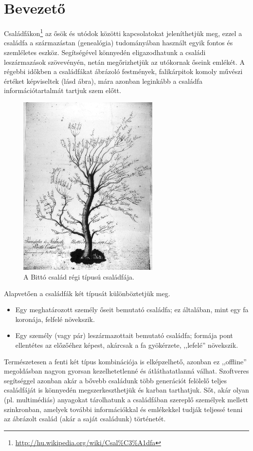 \chapter*{Bevezető}

Családfákon\footnote{\url{http://hu.wikipedia.org/wiki/Csal\%C3\%A1dfa}} az ősök és utódok közötti kapcsolatokat jeleníthetjük meg, ezzel a családfa a származástan (genealógia) tudományában használt egyik fontos és szemléletes eszköz. Segítségével könnyedén eligazodhatunk a családi leszármazások szövevényén, netán megőrizhetjük az utókornak őseink emlékét. A régebbi időkben a családfákat ábrázoló festmények, falikárpitok komoly művészi értéket képviseltek (lásd  ábra), mára azonban leginkább a családfa információtartalmát tartjuk szem előtt.

\begin{figure}[!ht]
\centering
\includegraphics[width=70mm, keepaspectratio]{figures/bitto_csaladfa.png}
\caption{A Bittó család régi típusú családfája.}
\label{fig:bitto_csaladfa}
\end{figure}

Alapvetően a családfák két típusát különböztetjük meg.

\begin{itemize}
 \item Egy meghatározott személy őseit bemutató családfa; ez általában, mint egy fa koronája, felfelé növekszik.
 \item Egy személy (vagy pár) leszármazottait bemutató családfa; formája pont ellentétes az előzőéhez képest, akárcsak a fa gyökérzete, ,,lefelé'' növekszik.
\end{itemize}

Természetesen a fenti két típus kombinációja is elképzelhető, azonban ez ,,offline'' megoldásban nagyon gyorsan kezelhetetlenné és átláthatatlanná válhat. Szoftveres segítséggel azonban akár a bővebb családunk több generációt felölelő teljes családfáját is könnyedén megszerkeszthetjük és karban tarthatjuk. Sőt, akár olyan (pl. multimédiás) anyagokat tárolhatunk a családfában szereplő személyek mellett szinkronban, amelyek további információkkal és emlékekkel tudják teljessé tenni az ábrázolt család (akár a saját családunk) történetét.
